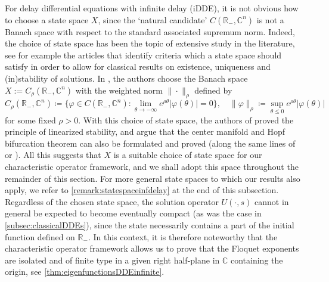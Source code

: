 \documentclass[english]{myarticle}
\begin{document}
\begin{sloppypar}
For delay differential equations with infinite delay (iDDE), it is not obvious how to choose a state space $X$, since the `natural candidate' $C(\mathbb{R}_{-},\mathbb{C}^n)$ is not a Banach space with respect to the standard associated supremum norm. Indeed, the choice of state space has been the topic of extensive study in the literature, see for example the articles \cite{Murakami1989,Hino1991,Hale1978,Hino1991} that identify criteria which a state space should satisfy in order to allow for classical results on existence, uniqueness and (in)stability of solutions. In \cite{Diekmann2012}, the authors choose the Banach space $X := C_\rho(\mathbb{R}_{-},\mathbb{C}^n)$ with the weighted norm $\| \cdot \|_\rho$ defined by
\begin{equation} \label{eq:statespaceinfdelay}
    C_\rho(\mathbb{R}_{-},\mathbb{C}^n) \coloneqq \bigg\{ \varphi \in C(\mathbb{R_{-}},\mathbb{C}^n) : \lim_{\theta \to -\infty} e^{\rho \theta} | \varphi(\theta) | = 0 \bigg\},  \quad \| \varphi \|_\rho \coloneqq \sup_{\theta \leq 0} e^{\rho \theta} | \varphi(\theta) |
\end{equation}
for some fixed $\rho > 0$. With this choice of state space, the authors of \cite{Diekmann2012} proved the principle of linearized stability, and argue that the center manifold and Hopf bifurcation theorem can also be formulated and proved (along the same lines of \cite{Diekmann1995} or \cite{Magal2009}). All this suggests that $X$ is a suitable choice of state space for our characteristic operator framework, and we shall adopt this space throughout the remainder of this section. For more general state spaces to which our results also apply, we refer to \cref{remark:statespaceinfdelay} at the end of this subsection. Regardless of the chosen state space, the solution operator $U(\cdot,s)$ cannot in general be expected to become eventually compact (as was the case in \cref{subsec:classicalDDEs}), since the state necessarily contains a part of the initial function defined on $\mathbb{R}_{-}$. In this context, it is therefore noteworthy that the characteristic operator framework allows us to prove that the Floquet exponents are isolated and of finite type in a given right half-plane in $\mathbb{C}$ containing the origin, see \cref{thm:eigenfunctionsDDEinfinite}. 


\end{sloppypar}
\end{document}
